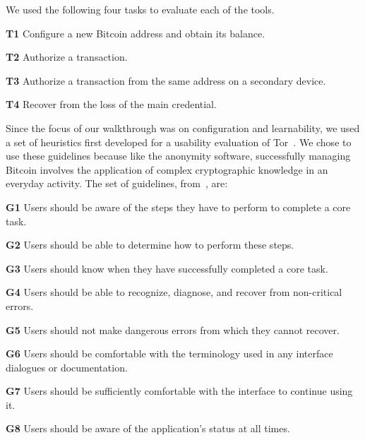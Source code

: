 We used the following four tasks to evaluate each of the tools.

\begin{compactlist}
	\item[\bf T1] Configure a new Bitcoin address and obtain its balance.\label{sec:ct-1}
	\item[\bf T2] Authorize a transaction.\label{sec:ct-2}
	\item[\bf T3] Authorize a transaction from the same address on a secondary device.\label{sec:ct-3}
	\item[\bf T4] Recover from the loss of the main credential.\label{sec:ct-4}
\end{compactlist}

Since the focus of our walkthrough was on configuration and learnability, we used a set of heuristics first developed for a usability evaluation of Tor~\cite{COA07}. We chose to use these guidelines because like the anonymity software, successfully managing Bitcoin involves the application of complex cryptographic knowledge in an everyday activity. The set of guidelines, from~\cite{COA07}, are: 



	
\begin{compactlist}
	\item[\bf G1] Users should be aware of the steps they have to perform to complete a core task.
	\item[\bf G2] Users should be able to determine how to perform these steps.
	\item[\bf G3] Users should know when they have successfully completed a core task.
	\item[\bf G4] Users should be able to recognize, diagnose, and recover from non-critical errors.
	\item[\bf G5] Users should not make dangerous errors from which they cannot recover.
	\item[\bf G6] Users should be comfortable with the terminology used in any interface dialogues or documentation.
	\item[\bf G7] Users should be sufficiently comfortable with the interface to continue using it.
	\item[\bf G8] Users should be aware of the application's status at all times.
\end{compactlist}


